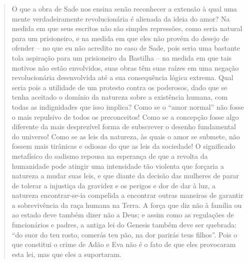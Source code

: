 \begin{quote}
O que a obra de Sade nos ensina senão reconhecer a extensão à qual uma
mente verdadeiramente revolucionária é alienada da ideia do amor? Na
medida em que seus escritos não são simples repressões, como seria
natural para um prisioneiro, e na medida em que eles não provém do
desejo de ofender -- no que eu não acredito no caso de Sade, pois seria
uma bastante tola aspiração para um prisioneiro da Bastilha -- na medida
em que tais motivos não estão envolvidos, suas obras têm suas raízes em
uma negação revolucionária desenvolvida até a sua consequência lógica
extrema. Qual seria pois a utilidade de um protesto contra os poderosos,
dado que se tenha aceitado o domínio da natureza sobre a existência
humana, com todas as indignidades que isso implica? Como se o ``amor
normal'' não fosse o mais repulsivo de todos os preconceitos! Como se a
concepção fosse algo diferente da mais desprezível forma de subscrever o
desenho fundamental do universo! Como se as leis da natureza, às quais o
amor se submete, não fossem mais tirânicas e odiosas do que as leis da
sociedade! O significado metafísico do sadismo repousa na esperança de
que a revolta da humanidade pode atingir uma intensidade tão violenta
que forçaria a natureza a mudar suas leis, e que diante da decisão das
mulheres de parar de tolerar a injustiça da gravidez e os perigos e dor
de dar à luz, a natureza encontrar-se-ia compelida a encontrar outras
maneiras de garantir a sobrevivência da raça humana na Terra. A força
que diz não à família ou ao estado deve também dizer não a Deus; e assim
como as regulações de funcionários e padres, a antiga lei do Genesis
também deve ser quebrada: ``do suor do teu rosto, comerás teu pão, na
dor parirás teus filhos''. Pois o que constitui o crime de Adão e Eva
não é o fato de que eles provocaram esta lei, mas que eles a suportaram.
\end{quote}

